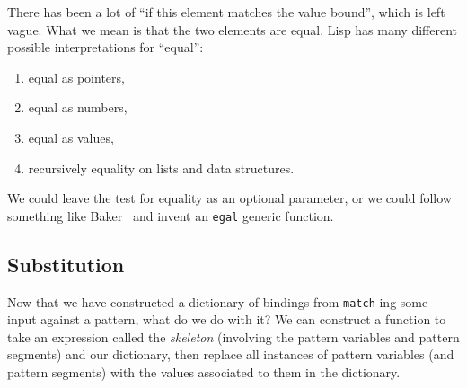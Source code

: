 There has been a lot of ``if this element matches the value bound'',
which is left vague. What we mean is that the two elements are equal.
Lisp has many different possible interpretations for ``equal'':
\begin{enumerate}
\item equal as pointers,
\item equal as numbers,
\item equal as values,
\item recursively equality on lists and data structures.
\end{enumerate}
We could leave the test for equality as an optional parameter, or we
could follow something like Baker~\cite{baker1993equal} and invent an
\lstinline[language=lisp]{egal} generic function.

\subsection{Substitution}

\M
Now that we have constructed a dictionary of bindings from
\lstinline[language=lisp]{match}-ing some input against a
pattern, what do we do with it? We can construct a function to take an
expression called the \emph{skeleton} (involving the pattern variables
and pattern segments) and our dictionary, then replace all instances of
pattern variables (and pattern segments) with the values associated to
them in the dictionary.


